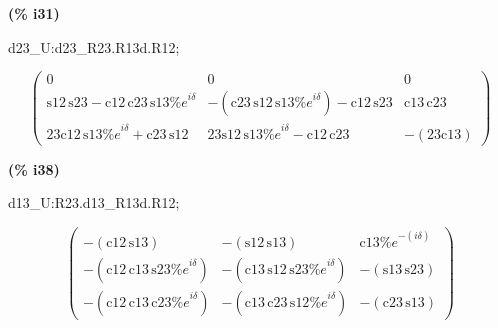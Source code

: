 \documentclass[fleqn]{article}
\begin{document}
\noindent
\begin{minipage}[t]{4.000000em}\color{red}\bfseries
(\% i31)	
\end{minipage}
\begin{minipage}[t]{\textwidth}\color{blue}
d23\_U:d23\_R23.R13d.R12;
\end{minipage}
\[\displaystyle \tag{d23\_ U} 
\begin{pmatrix}0 & 0 & 0\\
\ensuremath{\mathrm{s12}}\, \ensuremath{\mathrm{s23}}\mathop{-}\ensuremath{\mathrm{c12}}\, \ensuremath{\mathrm{c23}}\, \ensuremath{\mathrm{s13}} {{\% e}^{i \delta }} & \mathop{-}\left( \ensuremath{\mathrm{c23}}\, \ensuremath{\mathrm{s12}}\, \ensuremath{\mathrm{s13}} {{\% e}^{i \delta }}\right) \mathop{-}\ensuremath{\mathrm{c12}}\, \ensuremath{\mathrm{s23}} & \ensuremath{\mathrm{c13}}\, \ensuremath{\mathrm{c23}}\\
23 \ensuremath{\mathrm{c12}}\, \ensuremath{\mathrm{s13}} {{\% e}^{i \delta }}\mathop{+}\ensuremath{\mathrm{c23}}\, \ensuremath{\mathrm{s12}} & 23 \ensuremath{\mathrm{s12}}\, \ensuremath{\mathrm{s13}} {{\% e}^{i \delta }}\mathop{-}\ensuremath{\mathrm{c12}}\, \ensuremath{\mathrm{c23}} & \mathop{-}\left( 23 \ensuremath{\mathrm{c13}}\right) \end{pmatrix}\mbox{}
\]


\noindent
\begin{minipage}[t]{4.000000em}\color{red}\bfseries
(\% i38)	
\end{minipage}
\begin{minipage}[t]{\textwidth}\color{blue}
d13\_U:R23.d13\_R13d.R12;
\end{minipage}
\[\displaystyle \tag{d13\_ U} 
\begin{pmatrix}\mathop{-}\left( \ensuremath{\mathrm{c12}}\, \ensuremath{\mathrm{s13}}\right)  & \mathop{-}\left( \ensuremath{\mathrm{s12}}\, \ensuremath{\mathrm{s13}}\right)  & \ensuremath{\mathrm{c13}} {{\% e}^{-\left( i \delta \right) }}\\
\mathop{-}\left( \ensuremath{\mathrm{c12}}\, \ensuremath{\mathrm{c13}}\, \ensuremath{\mathrm{s23}} {{\% e}^{i \delta }}\right)  & \mathop{-}\left( \ensuremath{\mathrm{c13}}\, \ensuremath{\mathrm{s12}}\, \ensuremath{\mathrm{s23}} {{\% e}^{i \delta }}\right)  & \mathop{-}\left( \ensuremath{\mathrm{s13}}\, \ensuremath{\mathrm{s23}}\right) \\
\mathop{-}\left( \ensuremath{\mathrm{c12}}\, \ensuremath{\mathrm{c13}}\, \ensuremath{\mathrm{c23}} {{\% e}^{i \delta }}\right)  & \mathop{-}\left( \ensuremath{\mathrm{c13}}\, \ensuremath{\mathrm{c23}}\, \ensuremath{\mathrm{s12}} {{\% e}^{i \delta }}\right)  & \mathop{-}\left( \ensuremath{\mathrm{c23}}\, \ensuremath{\mathrm{s13}}\right) \end{pmatrix}\mbox{}
\]
\end{document}
